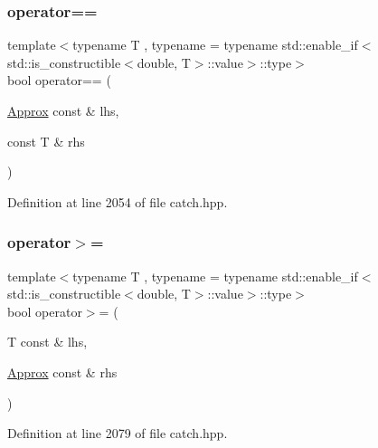 \subsubsection{\texorpdfstring{operator==}{operator==}\hspace{0.1cm}{\footnotesize\ttfamily [2/2]}}
{\footnotesize\ttfamily template$<$typename T , typename  = typename std\+::enable\+\_\+if$<$std\+::is\+\_\+constructible$<$double, T$>$\+::value$>$\+::type$>$ \\
bool operator== (\begin{DoxyParamCaption}\item[{\mbox{\hyperlink{class_catch_1_1_detail_1_1_approx}{Approx}} const \&}]{lhs,  }\item[{const T \&}]{rhs }\end{DoxyParamCaption})\hspace{0.3cm}{\ttfamily [friend]}}



Definition at line 2054 of file catch.\+hpp.

\mbox{\label{class_catch_1_1_detail_1_1_approx_affd27efc62be386daeecb7a09e828d44}} 
\subsubsection{\texorpdfstring{operator$>$=}{operator>=}\hspace{0.1cm}{\footnotesize\ttfamily [1/2]}}
{\footnotesize\ttfamily template$<$typename T , typename  = typename std\+::enable\+\_\+if$<$std\+::is\+\_\+constructible$<$double, T$>$\+::value$>$\+::type$>$ \\
bool operator$>$= (\begin{DoxyParamCaption}\item[{T const \&}]{lhs,  }\item[{\mbox{\hyperlink{class_catch_1_1_detail_1_1_approx}{Approx}} const \&}]{rhs }\end{DoxyParamCaption})\hspace{0.3cm}{\ttfamily [friend]}}



Definition at line 2079 of file catch.\+hpp.

\mbox{\label{class_catch_1_1_detail_1_1_approx_a5899b8a36725406701e2ebded2971ee6}} 
